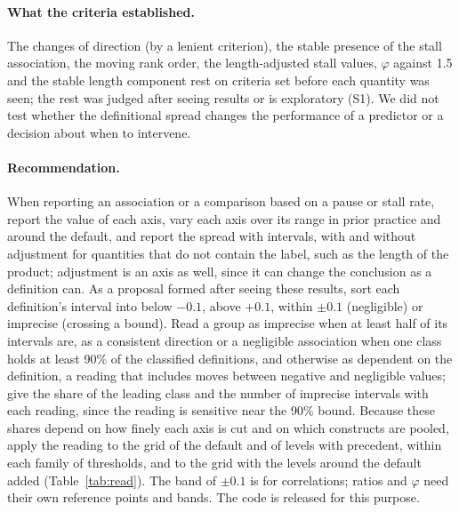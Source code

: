 \paragraph{What the criteria established.} The changes of direction (by a lenient criterion), the stable presence of
the stall association, the moving rank order, the length-adjusted stall values, $\varphi$ against 1.5 and the stable
length component rest on criteria set before each quantity was seen; the rest was judged after seeing results or is
exploratory (S1). We did not test whether the definitional spread changes the performance of a predictor
or a decision about when to intervene.

\paragraph{Recommendation.} When reporting an association or a comparison based on a pause or stall rate, report the
value of each axis, vary each axis over its range in prior practice and around the default, and report the spread with
intervals, with and without adjustment for quantities that do not contain the label, such as the length of the
product; adjustment is an axis as well, since it can change the conclusion as a definition can. As a proposal formed
after seeing these results, sort each definition's interval into below $-0.1$, above $+0.1$, within $\pm 0.1$
(negligible) or imprecise (crossing a bound). Read a group as imprecise when at least half of its intervals are, as a
consistent direction or a negligible association when one class holds at least 90\% of the classified definitions, and
otherwise as dependent on the definition, a reading that includes moves between negative and negligible values; give
the share of the leading class and the number of imprecise intervals with each reading, since the reading is sensitive
near the 90\% bound. Because these shares depend on how finely each axis is cut and on which constructs are pooled,
apply the reading to the grid of the default and of levels with precedent, within each family of thresholds, and to the
grid with the levels around the default added (Table~\ref{tab:read}). The band of $\pm 0.1$ is for correlations;
ratios and $\varphi$ need their own reference points and bands. The code is released for this purpose.
